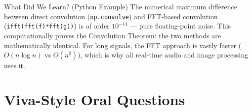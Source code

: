 \documentclass[12pt,a4paper]{article}
\begin{document}
\begin{learnbox}{What Did We Learn? (Python Example)}
The numerical maximum difference between direct convolution (\texttt{np.convolve})
and FFT-based convolution (\texttt{ifft(fft(f)*fft(g))}) is of order
$10^{-14}$ --- pure floating-point noise. This computationally proves the
Convolution Theorem: the two methods are mathematically identical. For long
signals, the FFT approach is vastly faster ($O(n\log n)$ vs $O(n^2)$), which
is why all real-time audio and image processing uses it.
\end{learnbox}

\section{Viva-Style Oral Questions}
\end{document}
